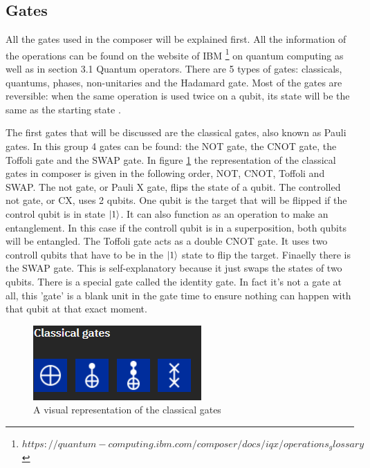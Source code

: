 \subsection{Gates}
\label{subsubsec:gates}
All the gates used in the composer will be explained first. All the information of the operations can be found on the website of IBM \footnote{$https://quantum-computing.ibm.com/composer/docs/iqx/operations_glossary$} on quantum computing as well as in \textcite{Hidary_2019} section 3.1 Quantum operators.
There are 5 types of gates: classicals, quantums, phases, non-unitaries and the Hadamard gate. Most of the gates are reversible: when the same operation is used twice on a qubit, its state will be the same as the starting state \autocite{reversible_gates, revgates}.

The first gates that will be discussed are the classical gates, also known as Pauli gates. In this group 4 gates can be found: the NOT gate, the CNOT gate, the Toffoli gate and the SWAP gate.
In figure \ref{fig:classical gates} the representation of the classical gates in composer is given in the following order, NOT, CNOT, Toffoli and SWAP.
The not gate, or Pauli X gate, flips the state of a qubit. The controlled not gate, or CX, uses 2 qubits. One qubit is the target that will be flipped if the control qubit is in state $\ket{1}$. It can also function as an operation to make an entanglement.
In this case if the controll qubit is in a superposition, both qubits will be entangled. The Toffoli gate acts as a double CNOT gate. It uses two controll qubits that have to be in the $\ket{1}$ state to flip the target.
Finaelly there is the SWAP gate. This is self-explanatory because it just swaps the states of two qubits. There is a special gate called the identity gate. In fact it's not a gate at all, this 'gate' is a blank unit in the gate time to ensure nothing can happen with that qubit at that exact moment.

\begin{figure} [h]
    \centering
    \includegraphics[width=\textwidth]{img/classical-gates.PNG}
        \caption{A visual representation of the classical gates}
        \label{fig:classical gates}
\end{figure}

